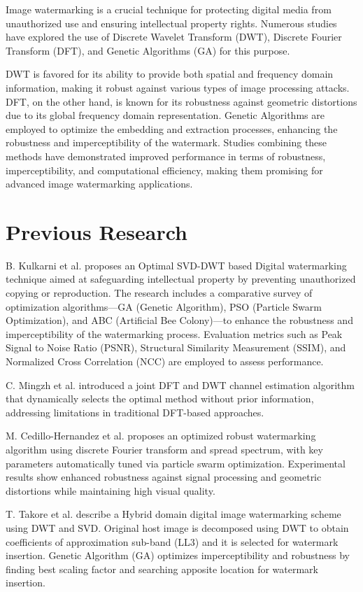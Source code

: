 Image watermarking is a crucial technique for protecting digital media from unauthorized use and ensuring intellectual property rights. Numerous studies have explored the use of Discrete Wavelet Transform (DWT), Discrete Fourier Transform (DFT), and Genetic Algorithms (GA) for this purpose.

DWT is favored for its ability to provide both spatial and frequency domain information, making it robust against various types of image processing attacks. DFT, on the other hand, is known for its robustness against geometric distortions due to its global frequency domain representation. Genetic Algorithms are employed to optimize the embedding and extraction processes, enhancing the robustness and imperceptibility of the watermark. Studies combining these methods have demonstrated improved performance in terms of robustness, imperceptibility, and computational efficiency, making them promising for advanced image watermarking applications.

\section{Previous Research}

B. Kulkarni et al. proposes an Optimal SVD-DWT based Digital watermarking technique aimed at safeguarding intellectual property by preventing unauthorized copying or reproduction. The research includes a comparative survey of optimization algorithms—GA (Genetic Algorithm), PSO (Particle Swarm Optimization), and ABC (Artificial Bee Colony)—to enhance the robustness and imperceptibility of the watermarking process. Evaluation metrics such as Peak Signal to Noise Ratio (PSNR), Structural Similarity Measurement (SSIM), and Normalized Cross Correlation (NCC) are employed to assess performance.

C. Mingzh et al. introduced a joint DFT and DWT channel estimation algorithm that dynamically selects the optimal method without prior information, addressing limitations in traditional DFT-based approaches.

M. Cedillo-Hernandez et al. proposes an optimized robust watermarking algorithm using discrete Fourier transform and spread spectrum, with key parameters automatically tuned via particle swarm optimization. Experimental results show enhanced robustness against signal processing and geometric distortions while maintaining high visual quality.

T. Takore et al. describe a Hybrid domain digital image watermarking scheme using DWT and SVD. Original host image is decomposed using DWT to obtain coefficients of approximation sub-band (LL3) and it is selected for watermark insertion. Genetic Algorithm (GA) optimizes imperceptibility and robustness by finding best scaling factor and searching apposite location for watermark insertion.

